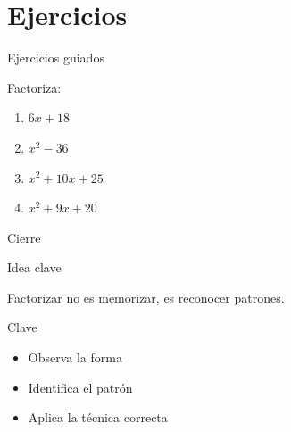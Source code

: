 \documentclass[aspectratio=169,12pt]{beamer}
\newcommand{\IdeaClave}[1]{
	\begin{block}{Idea clave}
		#1
	\end{block}
}
\begin{document}
	\section{Ejercicios}
	
	\begin{frame}{Ejercicios guiados}
		
		Factoriza:
		
		\begin{enumerate}
			\item \(6x + 18\)
			\pause
			\item \(x^2 - 36\)
			\pause
			\item \(x^2 + 10x + 25\)
			\pause
			\item \(x^2 + 9x + 20\)
		\end{enumerate}
		
	\end{frame}
	
	\begin{frame}{Cierre}
		
		\IdeaClave{
			Factorizar no es memorizar, es reconocer patrones.
		}
		
		\pause
		
		\begin{block}{Clave}
			\begin{itemize}
				\item Observa la forma
				\item Identifica el patrón
				\item Aplica la técnica correcta
			\end{itemize}
		\end{block}
		
	\end{frame}
	
\end{document}
